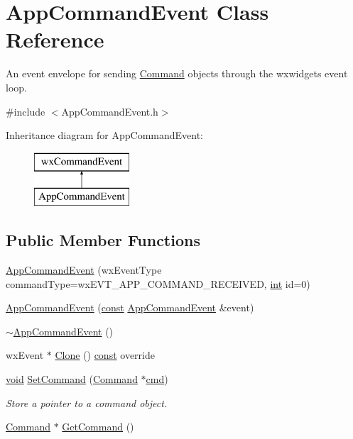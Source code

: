 \hypertarget{class_app_command_event}{}\section{App\+Command\+Event Class Reference}
\label{class_app_command_event}


An event \textquotesingle{}envelope\textquotesingle{} for sending \hyperlink{class_command}{Command} objects through the wxwidgets event loop.  




{\ttfamily \#include $<$App\+Command\+Event.\+h$>$}

Inheritance diagram for App\+Command\+Event\+:\begin{figure}[H]
\begin{center}
\leavevmode
\includegraphics[height=2.000000cm]{class_app_command_event}
\end{center}
\end{figure}
\subsection*{Public Member Functions}
\begin{DoxyCompactItemize}
\item 
\hyperlink{class_app_command_event_ab44c1edab624be03969c41bc513d04da}{App\+Command\+Event} (wx\+Event\+Type command\+Type=wx\+E\+V\+T\+\_\+\+A\+P\+P\+\_\+\+C\+O\+M\+M\+A\+N\+D\+\_\+\+R\+E\+C\+E\+I\+V\+ED, \hyperlink{xmltok_8h_a5a0d4a5641ce434f1d23533f2b2e6653}{int} id=0)
\item 
\hyperlink{class_app_command_event_a7870eed6faa78052f6523c9a2fe7a050}{App\+Command\+Event} (\hyperlink{getopt1_8c_a2c212835823e3c54a8ab6d95c652660e}{const} \hyperlink{class_app_command_event}{App\+Command\+Event} \&event)
\item 
\hyperlink{class_app_command_event_a418a522646856b51d5553749b4a8c68b}{$\sim$\+App\+Command\+Event} ()
\item 
wx\+Event $\ast$ \hyperlink{class_app_command_event_a7b7a79a881877cc9654294b02d50ead6}{Clone} () \hyperlink{getopt1_8c_a2c212835823e3c54a8ab6d95c652660e}{const}  override
\item 
\hyperlink{sound_8c_ae35f5844602719cf66324f4de2a658b3}{void} \hyperlink{class_app_command_event_ab9d64b11073537ed786420f2da366638}{Set\+Command} (\hyperlink{class_command}{Command} $\ast$\hyperlink{sndfile__play_8m_adfc5ba7e22f5e4a6221c12a70503bef3}{cmd})
\begin{DoxyCompactList}\small\item\em Store a pointer to a command object. \end{DoxyCompactList}\item 
\hyperlink{class_command}{Command} $\ast$ \hyperlink{class_app_command_event_a5243b772c6cf03dde6d882cf00a9d2ae}{Get\+Command} ()
\end{DoxyCompactItemize}


